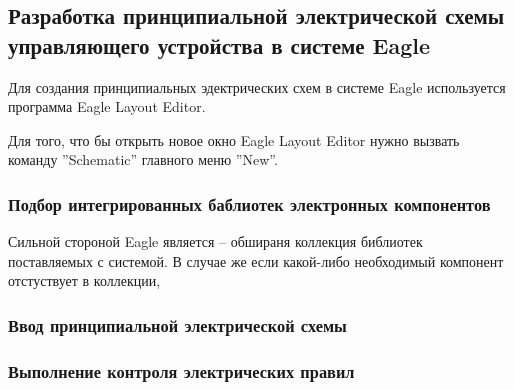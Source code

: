 \subsection{Разработка принципиальной электрической схемы управляющего устройства в системе Eagle}
Для создания принципиальных эдектрических схем в системе Eagle используется программа
Eagle Layout Editor.

Для того, что бы открыть новое окно Eagle Layout Editor нужно вызвать команду ''Schematic''
главного меню ''New''.




\subsubsection{Подбор интегрированных баблиотек электронных компонентов}
Сильной стороной Eagle является -- обшираня коллекция библиотек поставляемых с системой.
В случае же если какой-либо необходимый компонент отстуствует в коллекции, 

\subsubsection{Ввод принципиальной электрической схемы}
\subsubsection{Выполнение контроля электрических правил}
